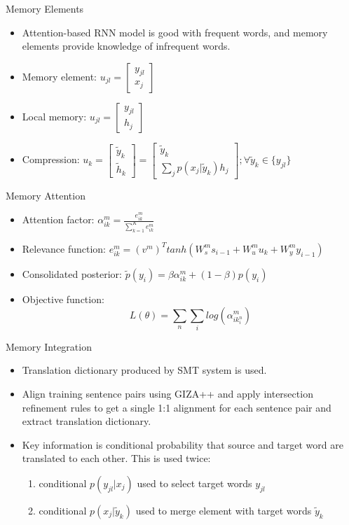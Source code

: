 \documentclass{beamer}
\begin{document}
\begin{frame}{Memory Elements}
\begin{itemize}
\item Attention-based RNN model is good with frequent words, and memory elements provide knowledge of infrequent words.
\item Memory element: $u_{jl}=\begin{bmatrix}y_{jl}\\x_j\end{bmatrix}$
\item Local memory: $u_{jl}=\begin{bmatrix}y_{jl}\\h_j\end{bmatrix}$
\item Compression: $u_k=\begin{bmatrix}\tilde{y}_k\\\tilde{h}_k\end{bmatrix}=\begin{bmatrix}\tilde{y}_k\\\sum_j{p(x_j|\tilde{y}_k)h_j}\end{bmatrix}; \forall\tilde{y}_k\in\{y_{jl}\}$
\end{itemize}
\end{frame}

\begin{frame}{Memory Attention}
\begin{itemize}
\item Attention factor: $\alpha^m_{ik}=\frac{e^m_{ik}}{\sum^K_{k=1}{e^m_{ik}}}$
\item Relevance function: $e^m_{ik}=(v^m)^Ttanh(W^m_ss_{i-1}+W^m_uu_k+W^m_yy_{i-1})$
\item Consolidated posterior: $\tilde{p}(y_i)=\beta\alpha^m_{ik}+(1-\beta)p(y_i)$
\item Objective function: $$L(\theta)=\sum_n{\sum_i{log(\alpha^m_{ik^n_i})}}$$
\end{itemize}
\end{frame}

\begin{frame}{Memory Integration}
\begin{itemize}
\item Translation dictionary produced by SMT system is used.
\item Align training sentence pairs using GIZA++ and apply intersection refinement rules to get a single 1:1 alignment for each sentence pair and extract translation dictionary.
\item Key information is conditional probability that source and target word are translated to each other. This is used twice:
\begin{enumerate}
\item conditional $p(y_{jl}|x_j)$ used to select target words $y_{jl}$
\item conditional $p(x_j|\tilde{y}_k)$ used to merge element with target words $\tilde{y}_k$
\end{enumerate}
\end{itemize}
\end{frame}
\end{document}
